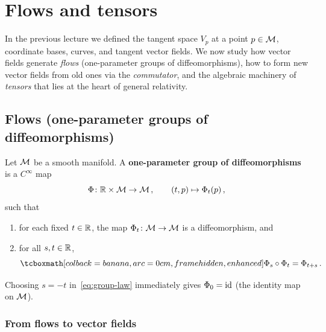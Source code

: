
\section{Flows and tensors}\label{sec:flows-tensors}

In the previous lecture we defined the tangent space $V_p$ at a
point $p\in\mathcal{M}$, coordinate bases, curves, and tangent vector
fields.  We now study how vector fields generate \emph{flows}
(one-parameter groups of diffeomorphisms), how to form new vector
fields from old ones via the \emph{commutator}, and the algebraic
machinery of \emph{tensors} that lies at the heart of general
relativity.

\subsection{Flows (one-parameter groups of diffeomorphisms)}%
\label{sec:flows}

\begin{definition}%
\label{def:one-param-group}
  Let $\mathcal{M}$ be a smooth manifold.  A \textbf{one-parameter group of
  diffeomorphisms} is a $C^\infty$ map
  \[
    \Phi\colon \mathbb{R}\times\mathcal{M} \to \mathcal{M}\,,
    \qquad (t,p)\mapsto \Phi_t(p)\,,
  \]
  such that
  \begin{enumerate}
    \item for each fixed $t\in\mathbb{R}$, the map
      $\Phi_t\colon\mathcal{M}\to\mathcal{M}$ is a diffeomorphism, and
    \item for all $s,t\in\mathbb{R}$,
      \begin{equation}\label{eq:group-law}
        \eqbox{\Phi_s \circ \Phi_t = \Phi_{t+s}}\,.
      \end{equation}
  \end{enumerate}
\end{definition}

\noindent
Choosing $s = -t$ in~\eqref{eq:group-law} immediately gives
$\Phi_0 = \operatorname{id}$ (the identity map on $\mathcal{M}$).



\subsubsection{From flows to vector fields}

